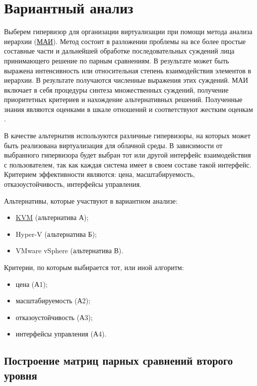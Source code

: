 \section{Вариантный анализ}

Выберем гипервизор для организации виртуализации при помощи метода анализа иерархии (\hyperlink{mai}{МАИ}).
Метод состоит в разложении проблемы на все более простые составные части и дальнейшей обработке последовательных суждений лица принимающего решение по парным сравнениям.
В результате может быть выражена интенсивность или относительная степень взаимодействия элементов в иерархии.
В результате получаются численные выражения этих суждений.
МАИ включает в себя процедуры синтеза множественных суждений, получение приоритетных критериев и нахождение альтернативных решений.
Полученные знания являются оценками в шкале отношений и соответствуют жестким оценкам \cite{var-analyz}.

В качестве альтернатив используются различные гипервизоры, на которых может быть реализована виртуализация для облачной среды.
В зависимости от выбранного гипервизора будет выбран тот или другой интерфейс взаимодействия с пользователем, так как каждая система имеет в своем составе такой интерфейс.
Критерием эффективности являются: цена, масштабируемость, отказоустойчивость, интерфейсы управления.

Альтернативы, которые участвуют в вариантном анализе:
\begin{itemize}
  \item \hyperlink{kvm}{KVM} (альтернатива А);
  \item Hyper-V (альтернатива Б);
  \item VMware vSphere (альтернатива В).
\end{itemize}

Критерии, по которым выбирается тот, или иной алгоритм:
\begin{itemize}
  \item цена (А1);
  \item масштабируемость (А2);
  \item отказоустойчивость (А3);
  \item интерфейсы управления (А4).
\end{itemize}

\subsection{Построение матриц парных сравнений второго уровня}

